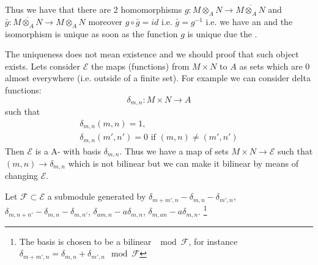 
Thus we have that there are 2 homomorphisms
$g :  M \otimes_A N \to \overline{ M \otimes_A N}$
and
$\bar{g} :  \overline{M \otimes_A N} \to M \otimes_A N$ moreover
$g \circ \bar{g} = id$ i.e. $\bar{g} = g^{-1}$ i.e. we have an
 and the isomorphism is unique as soon as the
function $g$ is unique due the .


The uniqueness does not mean existence and we should proof that such
object exists. Lets consider $\mathcal{E}$ the maps (functions) from
$M \times N$ to $A$ as sets which are $0$ almost everywhere
(i.e. outside of a finite set). For example we can consider delta
functions:
\[
\delta_{m,n} : M \times N \to A
\]
such that
\begin{eqnarray}
  \delta_{m,n}(m,n) = 1,
  \nonumber \\
  \delta_{m,n}(m',n') = 0 \mbox{ if } (m,n) \ne (m',n')
  \nonumber 
\end{eqnarray}
Then $\mathcal{E}$ is a A- with basis
$\delta_{m,n}$. Thus we have a map of sets $M \times N \to
\mathcal{E}$ such that $(m,n) \to \delta_{m,n}$ which is not bilinear
but we can make it bilinear by means of changing $\mathcal{E}$.

Let $\mathcal{F} \subset \mathcal{E}$ a submodule generated by
$\delta_{m+m',n} - \delta_{m,n} - \delta_{m',n}$,
$\delta_{m,n+n'} - \delta_{m,n} - \delta_{m,n'}$,
$\delta_{am,n} - a\delta_{m,n}$,
$\delta_{m,an} - a\delta_{m,n}$.
\footnote{
  The basis is chosen to be a bilinear $\mod \mathcal{F}$, for instance
  $\delta_{m+m',n} = \delta_{m,n} + \delta_{m',n} \mod \mathcal{F}$
}

